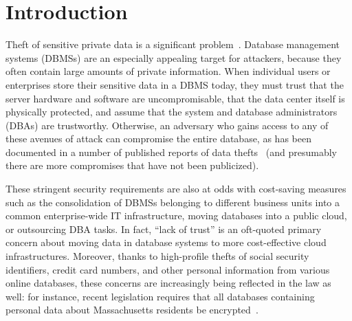 \section{Introduction}
\label{s:intro}

Theft of sensitive private data is a significant
problem~\cite{prc:breaches}.  Database management systems (DBMSs) are
an especially appealing target for attackers, because they often
contain large amounts of private information.  When individual
users or enterprises store their sensitive data in a DBMS today, they
must trust that the server hardware and software are uncompromisable,
that the data center itself is physically protected, and assume that
the system and database administrators (DBAs) 
are trustworthy.  Otherwise, an adversary who gains access to any of
these avenues of attack can compromise the entire database, as has
been documented in a number of published reports of data
thefts~\cite{prc:breaches} (and presumably there are more
compromises that have not been publicized).

These stringent security requirements are also at odds with
cost-saving measures such as the consolidation of DBMSs belonging to
different business units into a common enterprise-wide IT
infrastructure, moving databases into a public cloud, or outsourcing
DBA tasks.  In fact, ``lack of trust'' is an oft-quoted primary
concern about moving data in database systems to more cost-effective
cloud infrastructures.  Moreover, thanks to high-profile thefts of
social security identifiers, credit card numbers, and other personal
information from various online databases, these concerns are
increasingly being reflected in the law as well: for instance, recent
legislation requires that all databases containing personal data about
Massachusetts residents be encrypted~\cite{Masslaw}.


